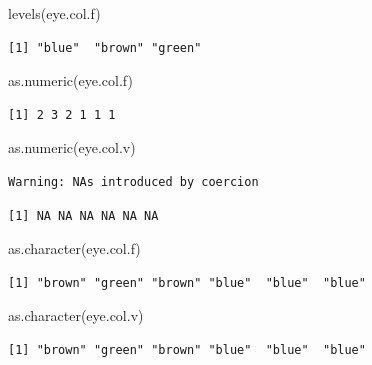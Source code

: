 \documentclass[
  letterpaper,
  DIV=11,
  numbers=noendperiod]{scrartcl}
\newenvironment{Shaded}{\begin{snugshade}}{\end{snugshade}}
\newcommand{\FunctionTok}[1]{\textcolor[rgb]{0.28,0.35,0.67}{#1}}
\newcommand{\NormalTok}[1]{\textcolor[rgb]{0.00,0.23,0.31}{#1}}
\begin{document}
\begin{Shaded}
\begin{Highlighting}[]
\FunctionTok{levels}\NormalTok{(eye.col.f)  }
\end{Highlighting}
\end{Shaded}

\begin{verbatim}
[1] "blue"  "brown" "green"
\end{verbatim}

\begin{Shaded}
\begin{Highlighting}[]
\FunctionTok{as.numeric}\NormalTok{(eye.col.f)  }
\end{Highlighting}
\end{Shaded}

\begin{verbatim}
[1] 2 3 2 1 1 1
\end{verbatim}

\begin{Shaded}
\begin{Highlighting}[]
\FunctionTok{as.numeric}\NormalTok{(eye.col.v)  }
\end{Highlighting}
\end{Shaded}

\begin{verbatim}
Warning: NAs introduced by coercion
\end{verbatim}

\begin{verbatim}
[1] NA NA NA NA NA NA
\end{verbatim}

\begin{Shaded}
\begin{Highlighting}[]
\FunctionTok{as.character}\NormalTok{(eye.col.f)}
\end{Highlighting}
\end{Shaded}

\begin{verbatim}
[1] "brown" "green" "brown" "blue"  "blue"  "blue" 
\end{verbatim}

\begin{Shaded}
\begin{Highlighting}[]
\FunctionTok{as.character}\NormalTok{(eye.col.v)}
\end{Highlighting}
\end{Shaded}

\begin{verbatim}
[1] "brown" "green" "brown" "blue"  "blue"  "blue" 
\end{verbatim}
\end{document}
